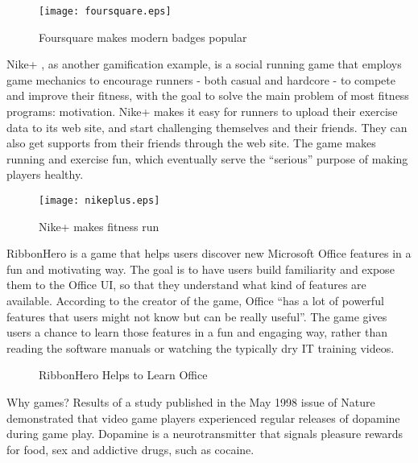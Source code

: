 \begin{figure}[htbp]
	\centering
		\texttt{[image: foursquare.eps]}
		\caption{Foursquare makes modern badges popular}
		\label{fig:foursquare}
\end{figure}

Nike+ \cite{nikeplus}, as another gamification example, is a social running game that employs game mechanics to encourage runners - both casual and hardcore - to compete and improve their fitness, with the goal to solve the main problem of most fitness programs: motivation. Nike+ makes it easy for runners to upload their exercise data to its web site, and start challenging themselves and their friends. They can also get supports from their friends through the web site. The game makes running and exercise fun, which eventually serve the ``serious'' purpose of making players healthy.

\begin{figure}[htbp]
	\centering
		\texttt{[image: nikeplus.eps]}
		\caption{Nike+ makes fitness run}
		\label{fig:nikeplus}
\end{figure}

RibbonHero \cite{ribbonhero} is a game that helps users discover new Microsoft Office features in a fun and motivating way. The goal is to have users build familiarity and expose them to the Office UI, so that they understand what kind of features are available. According to the creator of the game, Office ``has a lot of powerful features that users might not know but can be really useful''. The game gives users a chance to learn those features in a fun and engaging way, rather than reading the software manuals or watching the typically dry IT training videos.

\begin{figure}[htbp]
	\centering
		\caption{RibbonHero Helps to Learn Office}
		\label{fig:ribbon}
\end{figure}

Why games? Results of a study published in the May 1998 issue of Nature \cite {koepp1998evidence} demonstrated that video game players experienced regular releases of dopamine during game play. Dopamine is a neurotransmitter that signals pleasure rewards for food, sex and addictive drugs, such as cocaine. 

